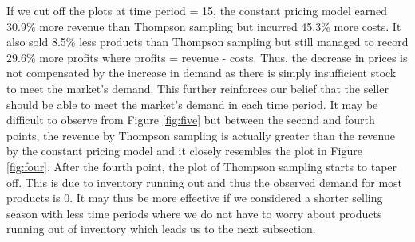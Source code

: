 \documentclass[a4paper]{article}
\begin{document}
\newline
If we cut off the plots at time period = 15, the constant pricing model earned 30.9\% more revenue than Thompson sampling but incurred 45.3\% more costs. It also sold 8.5\% less products than Thompson sampling but still managed to record 29.6\% more profits where profits = revenue - costs. Thus, the decrease in prices is not compensated by the increase in demand as there is simply insufficient stock to meet the market's demand. This further reinforces our belief that the seller should be able to meet the market's demand in each time period. It may be difficult to observe from Figure \ref{fig:five} but between the second and fourth points, the revenue by Thompson sampling is actually greater than the revenue by the constant pricing model and it closely resembles the plot in Figure \ref{fig:four}. After the fourth point, the plot of Thompson sampling starts to taper off. This is due to inventory running out and thus the observed demand for most products is 0. It may thus be more effective if we considered a shorter selling season with less time periods where we do not have to worry about products running out of inventory which leads us to the next subsection.
\end{document}
